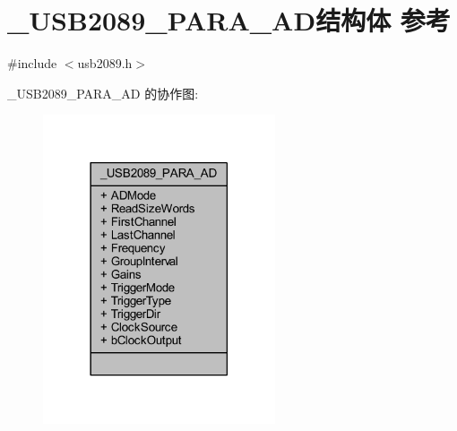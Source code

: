 \hypertarget{struct___u_s_b2089___p_a_r_a___a_d}{}\section{\+\_\+\+U\+S\+B2089\+\_\+\+P\+A\+R\+A\+\_\+\+A\+D结构体 参考}
\label{struct___u_s_b2089___p_a_r_a___a_d}


{\ttfamily \#include $<$usb2089.\+h$>$}



\+\_\+\+U\+S\+B2089\+\_\+\+P\+A\+R\+A\+\_\+\+AD 的协作图\+:
\nopagebreak
\begin{figure}[H]
\begin{center}
\leavevmode
\includegraphics[width=194pt]{struct___u_s_b2089___p_a_r_a___a_d__coll__graph}
\end{center}
\end{figure}
